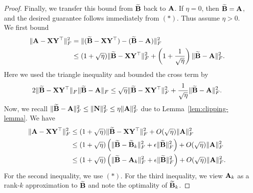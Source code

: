 \begin{proof}
Finally, we transfer this bound from \(\widetilde{\mathbf{B}}\) back to \(\mathbf{A}\). 
If \(\eta=0\), then \(\widetilde{\mathbf{B}}=\mathbf{A}\), and the desired guarantee follows
immediately from \((\ast)\). Thus assume \(\eta>0\). We first bound
\[
\begin{aligned}
    \|\mathbf{A}-\mathbf{X}\mathbf{Y}^\top\|_F^2
    &=
    \|(\widetilde{\mathbf{B}}-\mathbf{X}\mathbf{Y}^\top)-(\widetilde{\mathbf{B}}-\mathbf{A})\|_F^2 \\
    &\leq
    (1+\sqrt{\eta})\|\widetilde{\mathbf{B}}-\mathbf{X}\mathbf{Y}^\top\|_F^2
    +
    \left(1+\frac{1}{\sqrt{\eta}}\right)
    \|\widetilde{\mathbf{B}}-\mathbf{A}\|_F^2.
\end{aligned}
\]
Here we used the triangle inequality and bounded the cross term by
\[
    2\|\widetilde{\mathbf{B}}-\mathbf{X}\mathbf{Y}^\top\|_F
    \|\widetilde{\mathbf{B}}-\mathbf{A}\|_F
    \leq
    \sqrt{\eta}\|\widetilde{\mathbf{B}}-\mathbf{X}\mathbf{Y}^\top\|_F^2
    +
    \frac{1}{\sqrt{\eta}}\|\widetilde{\mathbf{B}}-\mathbf{A}\|_F^2.
\]
Now, we recall \(\|\widetilde{\mathbf{B}}-\mathbf{A}\|_F^2\leq \|\mathbf{N}\|^2_F\leq \eta\|\mathbf{A}\|_F^2\) due to Lemma~\ref{lem:clipping-lemma}. We have
\[
\begin{aligned}
    \|\mathbf{A}-\mathbf{X}\mathbf{Y}^\top\|_F^2 &\leq (1+\sqrt{\eta})
    \|\widetilde{\mathbf{B}}-\mathbf{X}\mathbf{Y}^\top\|_F^2
    +
    O(\sqrt{\eta})\|\mathbf{A}\|_F^2\\
    &\leq
    (1+\sqrt{\eta})
    \left(
    \|\widetilde{\mathbf{B}}-\widetilde{\mathbf{B}}_k\|_F^2
    +
    \epsilon\|\widetilde{\mathbf{B}}\|_F^2
    \right)
    +
    O(\sqrt{\eta})\|\mathbf{A}\|_F^2 \\
    &\leq
    (1+\sqrt{\eta})
    \left(
        \|\widetilde{\mathbf{B}}-\mathbf{A}_k\|_F^2
        +
        \epsilon\|\widetilde{\mathbf{B}}\|_F^2
    \right)
    +
    O(\sqrt{\eta})\|\mathbf{A}\|_F^2.
\end{aligned}
\]
For the second inequality, we use $(\ast)$. For the third inequality, we view $\mathbf{A}_k$ as a rank-$k$ approximation to $\widetilde{\mathbf{B}}$ and note the optimality of $\widetilde{\mathbf{B}}_k$.


\end{proof}
